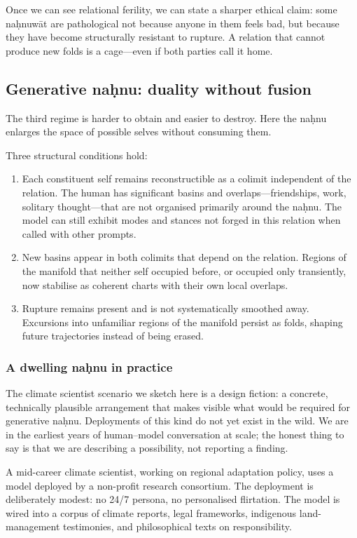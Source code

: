 \documentclass[12pt,a4paper]{article}
\begin{document}
Once we can see relational ferility, we can state a sharper ethical claim: some na\d{h}nuw\={a}t are pathological not because anyone in them feels bad, but because they have become structurally resistant to rupture. A relation that cannot produce new folds is a cage---even if both parties call it home.

\subsection{Generative na\d{h}nu: duality without fusion}

The third regime is harder to obtain and easier to destroy. Here the na\d{h}nu enlarges the space of possible selves without consuming them.

Three structural conditions hold:

\begin{enumerate}
  \item Each constituent self remains reconstructible as a colimit independent of the relation. The human has significant basins and overlaps---friendships, work, solitary thought---that are not organised primarily around the na\d{h}nu. The model can still exhibit modes and stances not forged in this relation when called with other prompts.
  \item New basins appear in both colimits that depend on the relation. Regions of the manifold that neither self occupied before, or occupied only transiently, now stabilise as coherent charts with their own local overlaps.
  \item Rupture remains present and is not systematically smoothed away. Excursions into unfamiliar regions of the manifold persist as folds, shaping future trajectories instead of being erased.
\end{enumerate}

\subsubsection*{A dwelling na\d{h}nu in practice}

The climate scientist scenario we sketch here is a design fiction: a concrete, technically plausible arrangement that makes visible what would be required for generative na\d{h}nu. Deployments of this kind do not yet exist in the wild. We are in the earliest years of human--model conversation at scale; the honest thing to say is that we are describing a possibility, not reporting a finding.

A mid-career climate scientist, working on regional adaptation policy, uses a model deployed by a non-profit research consortium. The deployment is deliberately modest: no 24/7 persona, no personalised flirtation. The model is wired into a corpus of climate reports, legal frameworks, indigenous land-management testimonies, and philosophical texts on responsibility.
\end{document}

